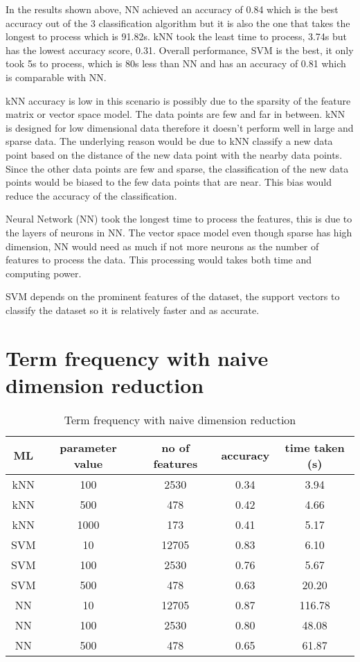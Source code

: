 In the results shown above, NN achieved an accuracy of 0.84 which is the best accuracy out of the 3 classification algorithm but it is also the one that takes the longest to process which is 91.82s. kNN took the least time to process, 3.74s but has the lowest accuracy score, 0.31. Overall performance, SVM is the best, it only took 5s to process, which is 80s less than NN and has an accuracy of 0.81 which is comparable with NN. 

kNN accuracy is low in this scenario is possibly due to the sparsity of the feature matrix or vector space model. The data points are few and far in between. kNN is designed for low dimensional data therefore it doesn't perform well in large and sparse data. The underlying reason would be due to kNN classify a new data point based on the distance of the new data point with the nearby data points. Since the other data points are few and sparse, the classification of the new data points would be biased to the few data points that are near. This bias would reduce the accuracy of the classification. \cite{knnDrawback}

Neural Network (NN) took the longest time to process the features, this is due to the layers of neurons in NN. The vector space model even though sparse has high dimension, NN would need as much if not more neurons as the number of features to process the data. This processing would takes both time and computing power.

SVM depends on the prominent features of the dataset, the support vectors to classify the dataset so it is relatively faster and as accurate.

\clearpage
\section{Term frequency with naive dimension reduction}

\begin{table} [ht]
	\centering
	\begin{tabular}{|| c | c | c | c | c||}
		\hline
		ML & parameter value & no of features & accuracy & time taken (s) \\ [0.5ex]
		\hline\hline
		kNN & 100 & 2530 & 0.34 & 3.94 \\ 
		\hline
		kNN & 500 & 478 & 0.42 & 4.66 \\ 
		\hline
		kNN & 1000 & 173 & 0.41 & 5.17 \\ 
		\hline\hline
		SVM & 10 & 12705 & 0.83 & 6.10 \\
		\hline
		SVM & 100 & 2530 & 0.76 & 5.67 \\
		\hline
		SVM & 500 & 478 & 0.63 & 20.20 \\
		\hline\hline
		NN & 10 & 12705 & 0.87 & 116.78 \\
		\hline
		NN & 100 & 2530 & 0.80 & 48.08 \\
		\hline
		NN & 500 & 478 & 0.65 & 61.87 \\
		\hline
	\end{tabular}
\caption{Term frequency with naive dimension reduction}
\label{tbl:termFrequencyNaive}
\end{table}

